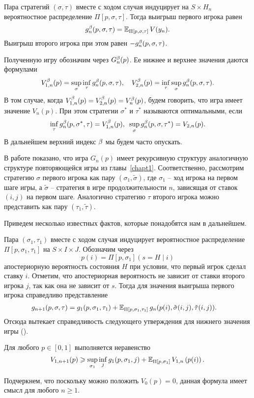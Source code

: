 {Пара стратегий $(\sigma, \tau)$ вместе с ходом случая индуцирует на $S \times H_n$ вероятностное распределение $\Pi[p, \sigma, \tau]$.
Тогда выигрыш первого игрока равен
\[
  g^{\beta}_n(p, \sigma, \tau) = \operatorname{\mathbb{E}}_{\Pi[p, \sigma, \tau]} V(y_{n}).
\]
Выигрыш второго игрока при этом равен $-g^{\beta}_n(p, \sigma, \tau)$.

Полученную игру обозначим через $G^{\beta}_n(p)$. 
Ее нижнее и верхнее значения даются формулами
\begin{align*}
  V^{\beta}_{1,n}(p) = \sup_\sigma \inf_\tau g^{\beta}_n(p, \sigma, \tau), \quad
  V^{\beta}_{2,n}(p) = \inf_\tau \sup_\sigma g^{\beta}_n(p, \sigma, \tau).
\end{align*}
В том случае, когда $V^{\beta}_{1,n}(p) = V^{\beta}_{2,n}(p) = V^{\beta}_n(p)$, будем говорить, что игра имеет значение $V_n(p)$.
При этом стратегии $\sigma^*$ и $\tau^*$ называются оптимальными, если
\[
  \inf_\tau g^{\beta}_n(p, \sigma^*, \tau) = V^{\beta}_{1,n}(p), \enskip 
  \sup_\sigma g^{\beta}_n(p, \sigma, \tau^*) = V_{2,n}(p).
\]
В дальнейшем верхний индекс $\beta$ мы будем часто опускать.

В работе \cite{demeyer02} показано, что игра $G_n(p)$ имеет рекурсивную структуру аналогичную структуре повторяющейся игры из главы~\ref{chapt1}.
Соответственно, рассмотрим стратегию $\sigma$ первого игрока как пару $(\sigma_1, \tilde{\sigma})$, где $\sigma_1$ -- ход игрока на первом шаге игры, а $\tilde{\sigma}$ -- стратегия в игре продолжительности $n$, зависящая от ставок $(i, j)$ на первом шаге.
Аналогично стратегию $\tau$ второго игрока можно представить как пару $(\tau_1, \tilde{\tau})$.

Приведем несколько известных фактов, которые понадобятся нам в дальнейшем.

Пара $(\sigma_1, \tau_1)$ вместе с ходом случая индуцирует вероятностное распределение $\Pi[p, \sigma_1, \tau_1]$ на $S \times I \times J$.
Обозначим через
\[
  p(i) = \Pi[p, \sigma_1](s = H \; | \; i)
\]
апостериорную вероятность состояния $H$ при условии, что первый игрок сделал ставку $i$.
Отметим, что апостериорная вероятность не зависит от ставки второго игрока $j$, так как она не зависит от $s$.
Тогда для значения выигрыша первого игрока справедливо представление
\begin{align*}
  g_{n+1}(p, \sigma, \tau) 
  &= 
    g_1(p, \sigma_1, \tau_1) +
    \operatorname{\mathbb{E}}_{\Pi[p, \sigma_1, \tau_1]}
    g_n(p(i), \tilde{\sigma}(i, j), \tilde{\tau}(i, j)).
\end{align*}
Отсюда вытекает справедливость следующего утверждения для нижнего значения игры (\seename \cite{demeyer02}).
\begin{lemma}
  \label{ch2:lem:low-bound-primal}
  Для любого $p \in [0, 1]$ выполняется неравенство
  \begin{equation}
    V_{1,n+1}(p) \geqslant \sup_{\sigma_1} \inf_{j} g_1(p, \sigma_1, j)
    + \operatorname{\mathbb{E}}_{\Pi[p, \sigma_1]} V_{1,n}\left( p(i) \right).
  \end{equation}
\end{lemma}
Подчеркнем, что поскольку можно положить $V_0(p) = 0$, данная формула имеет смысл для любого $n \geqslant 1$.

}
